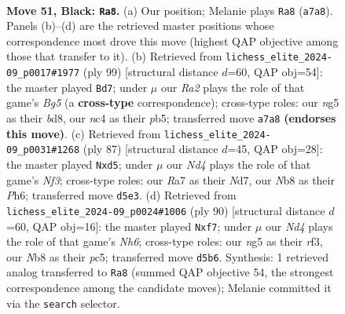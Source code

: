 \documentclass[11pt]{article}
\begin{document}
\clearpage

\begin{figure}[p]\centering
\begin{subfigure}{0.46\textwidth}\centering
\resizebox{\linewidth}{!}{%
\newchessgame
\chessboard[
  setfen={1nb2k2/r7/4p3/1P1n1pNB/1pN2P2/1P4P1/6KP/7R b - - 2 51},
  showmover=false,
  pgfstyle=straightmove, color=movearrow, markmove={a7-a8}
]}
\caption{}
\end{subfigure}\hfill
\begin{subfigure}{0.46\textwidth}\centering
\resizebox{\linewidth}{!}{%
\newchessgame
\chessboard[
  setfen={3B4/5k2/1p3pp1/1P1p3p/2nN2bP/4P1P1/5P2/6K1 b - - 3 50},
  showmover=false,
  pgfstyle=straightmove, color=movearrow, markmove={g4-d7}
]}
\caption{}
\end{subfigure}
\\[4pt]
\begin{subfigure}{0.46\textwidth}\centering
\resizebox{\linewidth}{!}{%
\newchessgame
\chessboard[
  setfen={7k/2pn4/1p2Nn1p/3P1P2/p7/P4PK1/1P3R2/2r2B2 b - - 10 44},
  showmover=false,
  pgfstyle=straightmove, color=movearrow, markmove={f6-d5}
]}
\caption{}
\end{subfigure}\hfill
\begin{subfigure}{0.46\textwidth}\centering
\resizebox{\linewidth}{!}{%
\newchessgame
\chessboard[
  setfen={2k5/2p2p2/pp4pN/2p1P2p/8/P1P1nr1P/7K/4R3 w - - 6 46},
  showmover=false,
  pgfstyle=straightmove, color=movearrow, markmove={h6-f7}
]}
\caption{}
\end{subfigure}
\caption{\textbf{Move 51, Black: \texttt{Ra8}.} (a) Our position; Melanie plays \texttt{Ra8} (\texttt{a7a8}). Panels (b)--(d) are the retrieved master positions whose correspondence most drove this move (highest QAP objective among those that transfer to it). (b) Retrieved from \texttt{lichess\_elite\_2024-09\_p0017\#1977} (ply 99) [structural distance $d$=60, QAP obj=54]: the master played \texttt{Bd7}; under $\mu$ our \emph{Ra2} plays the role of that game's \emph{Bg5} (a \textbf{cross-type} correspondence); cross-type roles: our \emph{n}g5 as their \emph{b}d8, our \emph{n}c4 as their \emph{p}b5; transferred move \texttt{a7a8} \textbf{(endorses this move)}. (c) Retrieved from \texttt{lichess\_elite\_2024-09\_p0031\#1268} (ply 87) [structural distance $d$=45, QAP obj=28]: the master played \texttt{Nxd5}; under $\mu$ our \emph{Nd4} plays the role of that game's \emph{Nf3}; cross-type roles: our \emph{R}a7 as their \emph{N}d7, our \emph{N}b8 as their \emph{P}h6; transferred move \texttt{d5e3}. (d) Retrieved from \texttt{lichess\_elite\_2024-09\_p0024\#1006} (ply 90) [structural distance $d$=60, QAP obj=16]: the master played \texttt{Nxf7}; under $\mu$ our \emph{Nd4} plays the role of that game's \emph{Nh6}; cross-type roles: our \emph{n}g5 as their \emph{r}f3, our \emph{N}b8 as their \emph{p}c5; transferred move \texttt{d5b6}. Synthesis: 1 retrieved analog transferred to \texttt{Ra8} (summed QAP objective 54, the strongest correspondence among the candidate moves); Melanie committed it via the \texttt{search} selector.}
\label{fig:thought-m101}
\end{figure}
\end{document}
